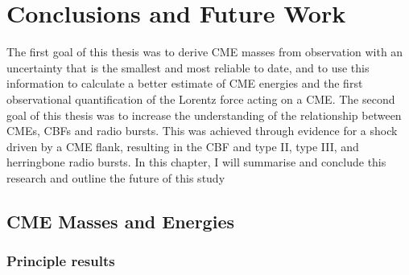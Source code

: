
\singlespacing
\chapter{Conclusions and Future Work} 

\label{chap:6}

\doublespacing
The first goal of this thesis was to derive CME masses from observation with an uncertainty that is the smallest and most reliable to date, and to use this information to calculate a better estimate of CME energies and the first observational quantification of the Lorentz force acting on a CME. 
The second goal of this thesis was to increase the understanding of the relationship between CMEs, CBFs and radio bursts. This was achieved through evidence for a shock driven by a CME flank, resulting in the CBF and type II, type III, and herringbone radio bursts. In this chapter, I will summarise and conclude this research and outline the future of this study
\clearpage

\section{CME Masses and Energies}

\subsection{Principle results}

